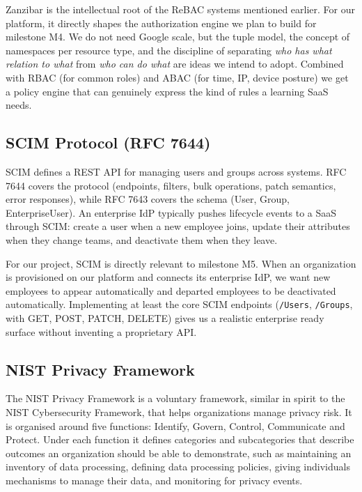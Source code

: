 \documentclass[11pt,a4paper]{article}
\begin{document}
Zanzibar is the intellectual root of the ReBAC systems mentioned earlier. For our platform, it directly shapes the authorization engine we plan to build for milestone M4. We do not need Google scale, but the tuple model, the concept of namespaces per resource type, and the discipline of separating \textit{who has what relation to what} from \textit{who can do what} are ideas we intend to adopt. Combined with RBAC (for common roles) and ABAC (for time, IP, device posture) we get a policy engine that can genuinely express the kind of rules a learning SaaS needs.

\subsection{SCIM Protocol (RFC 7644)}

SCIM defines a REST API for managing users and groups across systems. RFC 7644 covers the protocol (endpoints, filters, bulk operations, patch semantics, error responses), while RFC 7643 covers the schema (User, Group, EnterpriseUser). An enterprise IdP typically pushes lifecycle events to a SaaS through SCIM: create a user when a new employee joins, update their attributes when they change teams, and deactivate them when they leave.

For our project, SCIM is directly relevant to milestone M5. When an organization is provisioned on our platform and connects its enterprise IdP, we want new employees to appear automatically and departed employees to be deactivated automatically. Implementing at least the core SCIM endpoints (\texttt{/Users}, \texttt{/Groups}, with GET, POST, PATCH, DELETE) gives us a realistic enterprise ready surface without inventing a proprietary API.

\subsection{NIST Privacy Framework}

The NIST Privacy Framework is a voluntary framework, similar in spirit to the NIST Cybersecurity Framework, that helps organizations manage privacy risk. It is organised around five functions: Identify, Govern, Control, Communicate and Protect. Under each function it defines categories and subcategories that describe outcomes an organization should be able to demonstrate, such as maintaining an inventory of data processing, defining data processing policies, giving individuals mechanisms to manage their data, and monitoring for privacy events.
\end{document}
